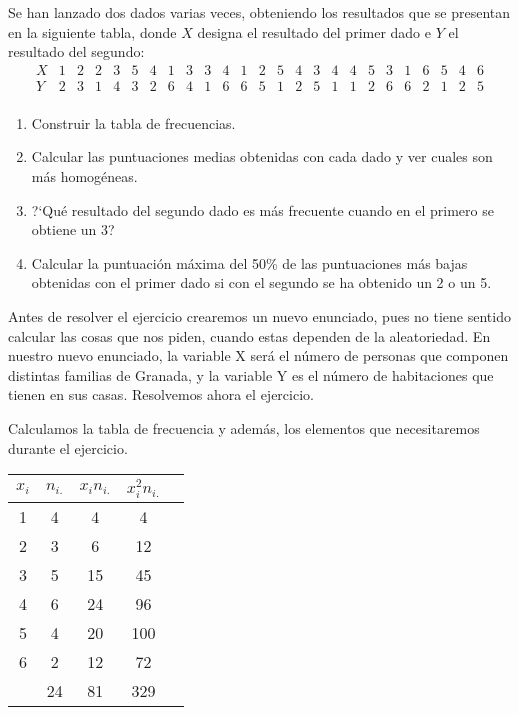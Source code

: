 \problem
Se han lanzado dos dados varias veces, obteniendo los resultados que se presentan en la siguiente tabla, donde $X$ designa el resultado del primer dado  e $Y$ el resultado del segundo:
$$
   \begin{array}{|c|c|c|c|c|c|c|c|c|c|c|c|c|c|c|c|c|c|c|c|c|c|c|c|c|}
 X & 1 & 2 & 2 & 3 & 5 & 4 & 1 & 3 & 3 & 4 & 1 & 2 & 5 & 4 & 3 & 4 & 4 & 5 & 3 & 1 & 6 & 5 & 4 & 6 \\ \hline
 Y & 2 & 3 & 1 & 4 & 3 & 2 & 6 & 4 & 1 & 6 & 6 & 5 & 1 & 2 & 5 & 1 & 1 & 2 & 6 & 6 & 2 & 1 & 2 & 5 \\
   \end{array}
$$

  \begin{enumerate}
     \item Construir la tabla de frecuencias.
     \item Calcular las puntuaciones medias obtenidas con cada dado y ver cuales son m\'as homog\'eneas.
     \item ?`Qu\'e
      resultado del segundo dado es  m\'as frecuente cuando en el primero se obtiene
        un 3?
     \item Calcular la puntuaci\'on m\'axima del 50\% de las puntuaciones m\'as bajas obtenidas con el primer dado si con el segundo se ha obtenido un 2 o un 5.
   \end{enumerate}

Antes de resolver el ejercicio crearemos un nuevo enunciado, pues no tiene sentido calcular las cosas que nos piden, cuando estas dependen de la aleatoriedad. En nuestro nuevo enunciado, la variable X será el número de personas que componen distintas familias de Granada, y la variable Y es el número de habitaciones que tienen en sus casas. Resolvemos ahora el ejercicio.

\subproblem
Calculamos la tabla de frecuencia y además, los elementos que necesitaremos durante el ejercicio.

\begin{table}[h]
    \centering
    \begin{tabular}{|c|c|c|c|c|}
        \hline
         $x_i$ & $n_{i.}$ & $x_{i}n_{i.}$ & $x_i^2 n_{i.}$ \\ \hline
         1 & 4 & 4 & 4 \\ \hline 
         2 & 3 & 6 & 12 \\ \hline 
         3 & 5 & 15 & 45\\ \hline 
         4 & 6 & 24 & 96 \\ \hline 
         5 & 4 & 20 & 100 \\ \hline 
         6 & 2 & 12 & 72 \\ \hline 
          & 24 & 81 & 329 \\ \hline 
    \end{tabular}
\end{table}

